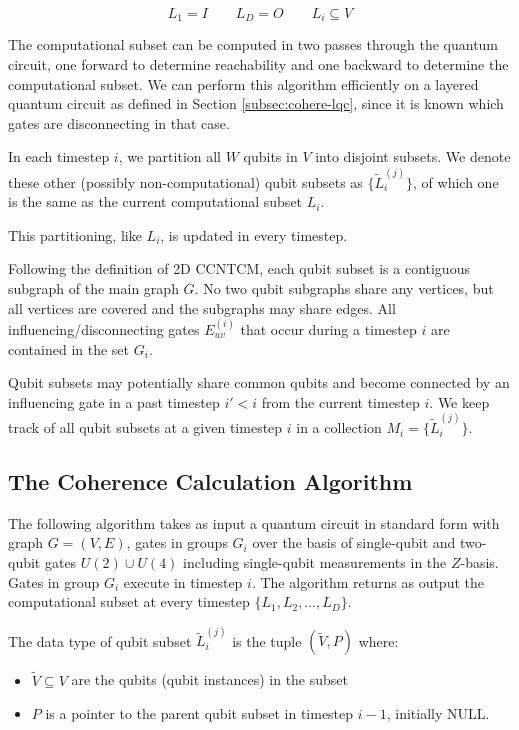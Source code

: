 \begin{equation}
L_1 = I \qquad L_D = O \qquad L_i \subseteq V
\end{equation}

The computational subset can be computed in two passes through
the quantum circuit, one forward to determine reachability and one backward
to determine the computational subset. We can perform this algorithm efficiently on a
layered quantum circuit as defined in Section \ref{subsec:cohere-lqc},
since it is known which gates are disconnecting in that case.

In each timestep $i$, we partition all $W$ qubits in $V$ into disjoint
subsets. We denote these other
(possibly non-computational) qubit subsets as $\{\tilde{L}^{(j)}_i\}$,
of which one is the same as the current
computational subset $L_i$.

This partitioning, like $L_i$, is updated in
every timestep.

Following the definition of \textsf{2D CCNTCM}, each qubit subset is a
contiguous subgraph of the main graph $G$. No two qubit subgraphs share any vertices,
but all vertices are covered and the subgraphs may share edges. All influencing/disconnecting gates $E^{(i)}_{uv}$
that occur during a timestep $i$ are contained in the set $G_i$.

Qubit subsets may potentially share common qubits and become connected by an influencing gate
in a past timestep $i' < i$ from the current timestep $i$.
We keep track of all qubit subsets at a given timestep $i$
in a collection $M_i = \{\tilde{L}^{(j)}_i \}$.

\subsection{The Coherence Calculation Algorithm}
\label{subsec:cohere-algo}

The following algorithm takes as input a quantum circuit in standard form
with graph $G = (V,E)$, gates in groups $G_i$
over the basis of single-qubit and two-qubit gates
$U(2) \cup U(4)$ including single-qubit measurements in the $Z$-basis.
Gates in group $G_i$ execute in timestep $i$.
The algorithm returns as output the computational subset at every timestep $\{ L_1, L_2, \ldots, L_D \}$.

The data type of qubit subset $\tilde{L}^{(j)}_i$ is the tuple
$(\tilde{V}, P)$ where:

\begin{itemize}
\item $\tilde{V} \subseteq V$ are the qubits (qubit instances) in the subset
\item $P$ is a pointer to the parent qubit subset in timestep ${i-1}$, initially \textsc{NULL}.
\end{itemize}

